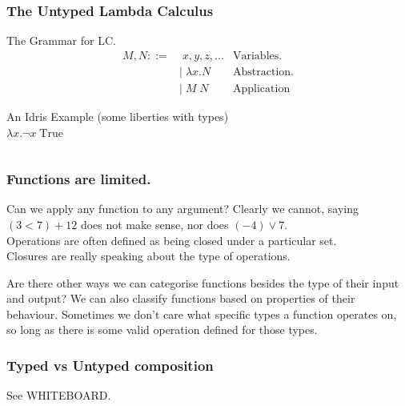 \documentclass
  [hyperref={colorlinks = true,linkcolor = blue, 
             citecolor = blue, urlcolor = blue}
  ]{beamer}
\begin{document}
\begin{frame}[fragile]
\frametitle{The Untyped Lambda Calculus}  
  \begin{block}{The Grammar for LC.}
  \begin{align*}
    M, N ::= & \; x, y, z, ...  &\text{Variables.} \\
             &| \; \lambda x.N  &\text{Abstraction.} \\
             &| \; M \; N       &\text{Application}
  \end{align*}  
  \end{block}
  \begin{block}{An Idris Example (some liberties with types) 
  \\ $\lambda x.\lnot x \; \text{True}$}
  \inputminted{idris}{../Code/src/Lambda.idr}
\end{block}
\end{frame}

\begin{frame}[fragile]
\frametitle{Functions are limited.}
  \begin{block}{Can we apply any function to any argument?}
  Clearly we cannot, saying $(3 < 7) + 12$ does not make
  sense, nor does $ (-4) \lor 7$. 
  \\ Operations are often defined as being closed under 
  a particular set. \\
  Closures are really speaking about the type of operations.
  \end{block}
  \begin{block}{Are there other ways we can categorise
    functions besides the type of their input and output?}
  We can also classify functions based on properties of their
  behaviour. Sometimes we don't care what specific types
  a function operates on, so long as there is some valid
  operation defined for those types.
  \end{block}
\end{frame}

\begin{frame}[fragile]
\frametitle{Typed vs Untyped composition}
See WHITEBOARD.
\end{frame}
\end{document}
